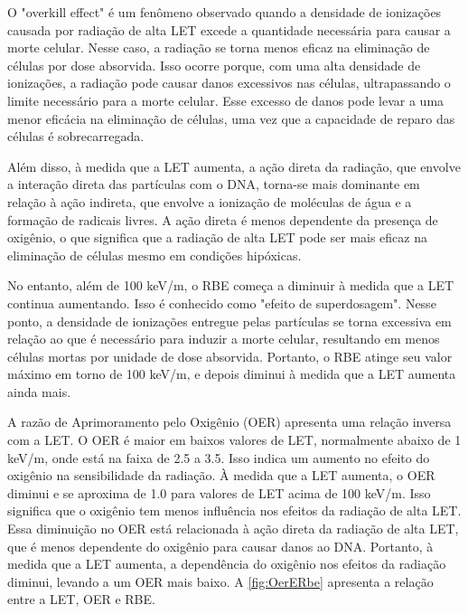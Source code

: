 \documentclass[11pt,a4paper]{article}
\begin{document}
	O "overkill effect" é um fenômeno observado quando a densidade de ionizações causada por radiação de alta LET excede a quantidade necessária para causar a morte celular. Nesse caso, a radiação se torna menos eficaz na eliminação de células por dose absorvida. Isso ocorre porque, com uma alta densidade de ionizações, a radiação pode causar danos excessivos nas células, ultrapassando o limite necessário para a morte celular. Esse excesso de danos pode levar a uma menor eficácia na eliminação de células, uma vez que a capacidade de reparo das células é sobrecarregada. 

	Além disso, à medida que a LET aumenta, a ação direta da radiação, que envolve a interação direta das partículas com o DNA, torna-se mais dominante em relação à ação indireta, que envolve a ionização de moléculas de água e a formação de radicais livres. A ação direta é menos dependente da presença de oxigênio, o que significa que a radiação de alta LET pode ser mais eficaz na eliminação de células mesmo em condições hipóxicas.

	No entanto, além de 100 keV/\mu m, o RBE começa a diminuir à medida que a LET continua aumentando. Isso é conhecido como "efeito de superdosagem". Nesse ponto, a densidade de ionizações entregue pelas partículas se torna excessiva em relação ao que é necessário para induzir a morte celular, resultando em menos células mortas por unidade de dose absorvida. Portanto, o RBE atinge seu valor máximo em torno de 100 keV/\mu m, e depois diminui à medida que a LET aumenta ainda mais.

	A razão de Aprimoramento pelo Oxigênio (OER) apresenta uma relação inversa com a LET. O OER é maior em baixos valores de LET, normalmente abaixo de 1 keV/\mu m, onde está na faixa de 2.5 a 3.5. Isso indica um aumento no efeito do oxigênio na sensibilidade da radiação. À medida que a LET aumenta, o OER diminui e se aproxima de 1.0 para valores de LET acima de 100 keV/\mu m. Isso significa que o oxigênio tem menos influência nos efeitos da radiação de alta LET. Essa diminuição no OER está relacionada à ação direta da radiação de alta LET, que é menos dependente do oxigênio para causar danos ao DNA. Portanto, à medida que a LET aumenta, a dependência do oxigênio nos efeitos da radiação diminui, levando a um OER mais baixo. A \ref{fig:OerERbe} apresenta a relação entre a LET, OER e RBE.
\end{document}
